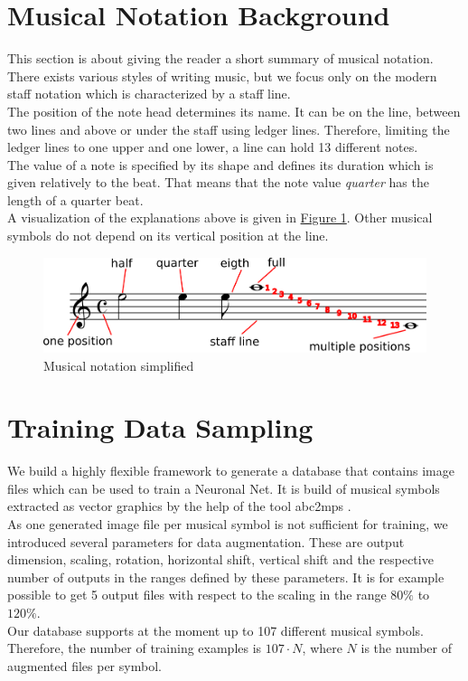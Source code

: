 \documentclass[twocolumn]{article}
\begin{document}
\section{Musical Notation Background}
This section is about giving the reader a short summary of musical notation.\\
There exists various styles of writing music, but we focus only on the modern staff notation which is characterized by a staff line. \\
The position of the note head determines its name. It can be on the line, between two lines and above or under the staff using ledger lines. Therefore, limiting the ledger lines to one upper and one lower, a line can hold 13 different notes. \\
The value of a note is specified by its shape and defines its duration which is given relatively to the beat. That means that the note value \textit{quarter} has the length of a quarter beat. \\
A visualization of the explanations above is given in \hyperref[musical_notation]{Figure 1}. 
Other musical symbols do not depend on its vertical position at the line. 


\begin{figure}
 \includegraphics[width=\linewidth]{notation.png}
 \caption{Musical notation simplified}
 \label{musical_notation}
\end{figure}

\section{Training Data Sampling}
We build a highly flexible framework to generate a database that contains image files which can be used to train a Neuronal Net. It is build of musical symbols extracted as vector graphics by the help of the tool abc2mps \citet{abc2mps}. \\
As one generated image file per musical symbol is not sufficient for training, we introduced several parameters for data augmentation. These are output dimension, scaling, rotation, horizontal shift, vertical shift and the respective number of outputs in the ranges defined by these parameters. It is for example possible to get 5 output files with respect to the scaling in the range $80\%$ to $120\%$. \\
Our database supports at the moment up to 107 different musical symbols. Therefore, the number of training examples is $107 \cdot N$, where $N$ is the number of augmented files per symbol. 
\end{document}

